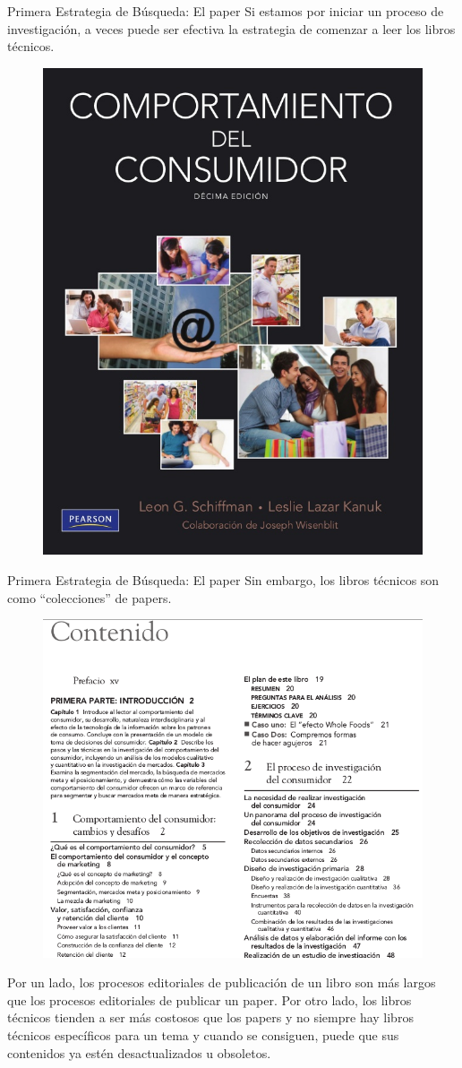 \documentclass[9pt]{beamer}
\begin{document}
\begin{frame}{Primera Estrategia de Búsqueda: El paper}
Si estamos por iniciar un proceso de investigación, a veces puede ser efectiva la estrategia de comenzar a leer los libros técnicos.
\begin{figure}
\centering
 \includegraphics[width=.4\textwidth]{b5}
\end{figure}
\end{frame}

\begin{frame}{Primera Estrategia de Búsqueda: El paper}
Sin embargo, los libros técnicos son como ``colecciones'' de papers.
\begin{figure}
\centering
 \includegraphics[width=.4\textwidth]{b6}
\end{figure}
Por un lado, los procesos editoriales de publicación de un libro son más largos que los procesos editoriales de publicar un paper. Por otro lado, los libros técnicos tienden a ser más costosos que los papers y no siempre hay libros técnicos específicos para un tema y cuando se consiguen, puede que sus contenidos ya estén desactualizados u obsoletos.
\end{frame}
\end{document}
